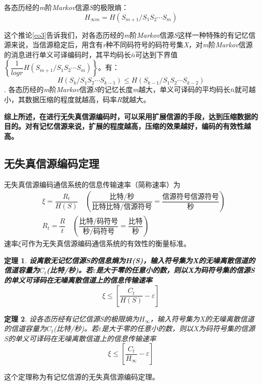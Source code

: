 \documentclass[UTF8]{ctexart}
\theoremstyle{plain}
\newtheorem{theorem}{定理}[section]
\theoremstyle{definition}
\theoremstyle{remark}
\begin{document}
各态历经的\emph{m}阶\emph{Markov}信源\emph{S}的极限熵：
\begin{equation}
\label{6.90}
H_{\infty m} = H(S_{m+1}/S_1 S_2 \cdots S_m)
\end{equation}

这个推论\cref{co3}告诉我们，对各态历经的\emph{m}阶\emph{Markov}信源\emph{S}这样一种特殊的有记忆信源来说，当信源稳定后，用含有\emph{r}种不同码符号的码符号集\emph{X}，对\emph{m}阶\emph{Markov}信源的消息进行单义可译编码时，其平均码长$\bar{n}$可达到下界值$\left\{\dfrac{1}{logr}H(S_{m+1}/S_1 S_2 \cdots S_m)\right\}$。有：
\begin{equation}
\label{6.93}
H(S_k/S_1 S_2 \cdots S_{k-1}) \leqslant H(S_{k-1}/S_1 S_2 \cdots S_{k-2})
\end{equation}.
各态历经的\emph{m}阶\emph{Markov}信源\emph{S}的记忆长度\emph{m}越大，单义可译码的平均码长$\bar{n}$就可越小，其数据压缩的程度就越高，码率\emph{R}就越大。

\textcolor[rgb]{1,0,0}{\textbf{综上所述，在进行无失真信源编码时，可以采用扩展信源的手段，达到压缩数据的目的。对有记忆信源来说，扩展的程度越高，压缩的效果越好，编码的有效性越高。}}

\subsection{无失真信源编码定理}
无失真信源编码通信系统的信息传输速率（简称速率）为
\begin{eqnarray}
\label{6.96}
& \xi = \dfrac{R_t}{H(S)}\quad \left(\dfrac{\text{比特/秒}}{\text{比特比特/信源符号}}=\dfrac{\text{信源符号信源符号}}{\text{秒}}\right) \\
\label{6.95}
& R_t = \dfrac{R}{t}\quad\left(\dfrac{\text{比特/码符号}}{\text{秒/码符号}}=\dfrac{\text{比特}}{\text{秒}}\right)
\end{eqnarray}
速率$\xi$可作为无失真信源编码通信系统的有效性的衡量标准。
\begin{theorem}
	\label{6.7}
	\textbf{设离散无记忆信源\emph{S}的信息熵为\emph{H(S)}，输入符号集为\emph{X}的无噪离散信道的信道容量为$C_t$(比特/秒)。若$\varepsilon$是大于零的任意小的数，则以\emph{X}为码符号集的信源\emph{S}的单义可译码在无噪离散信道上的信息传输速率}
	\begin{equation}
	\label{6.97}
	\xi \leqslant \left[ \dfrac{C_t}{H(S)}-\varepsilon \right]
	\end{equation}
\end{theorem}

\begin{theorem}
	\label{6.8}
	设各态历经有记忆信源\emph{S}的极限熵为$H_{\infty}$，输入符号集为\emph{X}的无噪离散信道的信道容量为$C_t$(比特/秒)。若$\varepsilon$是大于零的任意小的数，则以\emph{X}为码符号集的信源\emph{S}的单义可译码在无噪离散信道上的信息传输速率
	\begin{equation}
	\label{6.104}
	\xi \leqslant \left[ \dfrac{C_t}{H_{\infty}}-\varepsilon \right]
	\end{equation}
\end{theorem}
这个定理称为有记忆信源的无失真信源编码定理。
\end{document}

